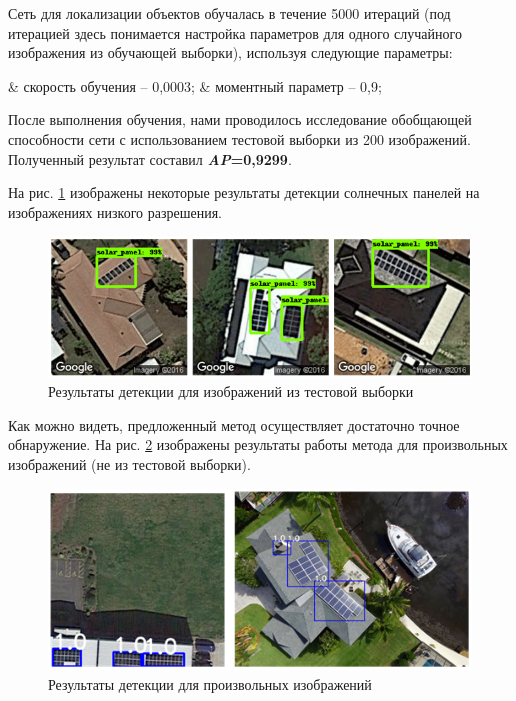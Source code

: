 Сеть для локализации объектов обучалась в течение 5000 итераций (под итерацией здесь понимается настройка параметров для одного случайного изображения из обучающей выборки), используя следующие параметры:

\begin{easylist}
    & скорость обучения -- 0,0003;
    & моментный параметр -- 0,9;
\end{easylist}

После выполнения обучения, нами проводилось исследование обобщающей способности сети с использованием тестовой выборки из 200 изображений. Полученный результат составил \textbf{\textit{AP}=0,9299}.

На рис. \ref{fig:test_results} изображены некоторые результаты детекции солнечных панелей на изображениях низкого разрешения.

\begin{figure}[ht]
	\centering
	\includegraphics[width=16cm]{man-source/images/ch4/pic4-22.png}
	\caption{Результаты детекции для изображений из тестовой выборки}
	\label{fig:test_results}
\end{figure}

Как можно видеть, предложенный метод осуществляет достаточно точное обнаружение. На рис. \ref{fig:random_results} изображены результаты работы метода для произвольных изображений (не из тестовой выборки).

\begin{figure}[ht]
	\centering
	\includegraphics[width=16cm]{man-source/images/ch4/pic4-23.png}
	\caption{Результаты детекции для произвольных изображений}
	\label{fig:random_results}
\end{figure}

